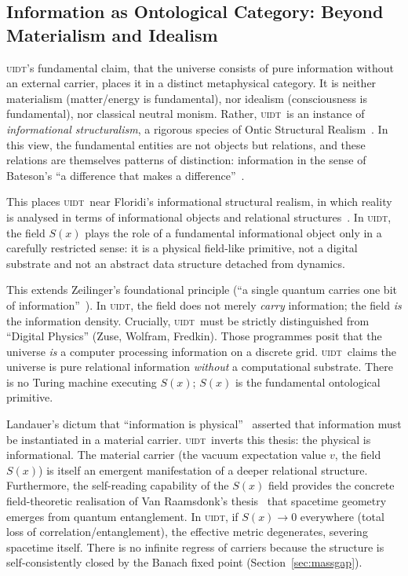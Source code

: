 \documentclass[12pt,a4paper,twoside]{article}
\theoremstyle{plain}
\theoremstyle{definition}
\theoremstyle{remark}
\newcommand{\UIDT}{\textsc{uidt}}
\newcommand{\Sx}{S(x)}
\begin{document}
\newpage
\subsection{Information as Ontological Category: Beyond Materialism and Idealism}
\label{subsec:information-ontology}

\UIDT's fundamental claim, that the universe consists of pure information
without an external carrier, places it in a distinct metaphysical category.
It is neither materialism (matter/energy is fundamental), nor idealism
(consciousness is fundamental), nor classical neutral monism. Rather, \UIDT\ is
an instance of \emph{informational structuralism}, a rigorous species of
Ontic Structural Realism~\cite{LadymanRoss2007}. In this view, the fundamental
entities are not objects but relations, and these relations are themselves
patterns of distinction: information in the sense of Bateson's ``a difference
that makes a difference''~\cite{Bateson1972}.

This places \UIDT\ near Floridi's informational structural realism, in which
reality is analysed in terms of informational objects and relational
structures~\cite{Floridi2008}. In \UIDT, the field $\Sx$ plays the role of a
fundamental informational object only in a carefully restricted sense: it is a
physical field-like primitive, not a digital substrate and not an abstract data
structure detached from dynamics.

This extends Zeilinger's foundational principle (``a single quantum carries one bit of information''~\cite{Zeilinger1999}). In \UIDT, the field does not merely \textit{carry} information; the field \textit{is} the information density. Crucially, \UIDT\ must be strictly distinguished from ``Digital Physics'' (Zuse, Wolfram, Fredkin). Those programmes posit that the universe \textit{is} a computer processing information on a discrete grid. \UIDT\ claims the universe is pure relational information \textit{without} a computational substrate. There is no Turing machine executing $S(x)$; $S(x)$ is the fundamental ontological primitive.

Landauer's dictum that ``information is physical''~\cite{Landauer1961}
asserted that information must be instantiated in a material carrier. \UIDT\
inverts this thesis: the physical is informational. The material carrier (the
vacuum expectation value $v$, the field $S(x)$) is itself an emergent
manifestation of a deeper relational structure. Furthermore, the self-reading capability of the $S(x)$ field provides the concrete field-theoretic realisation of Van Raamsdonk's thesis~\cite{VanRaamsdonk2010} that spacetime geometry emerges from quantum entanglement. In \UIDT, if $S(x) \to 0$ everywhere (total loss of correlation/entanglement), the effective metric degenerates, severing spacetime itself. There is no infinite regress of carriers because the structure is
self-consistently closed by the Banach fixed point (Section~\ref{sec:massgap}).
\end{document}
